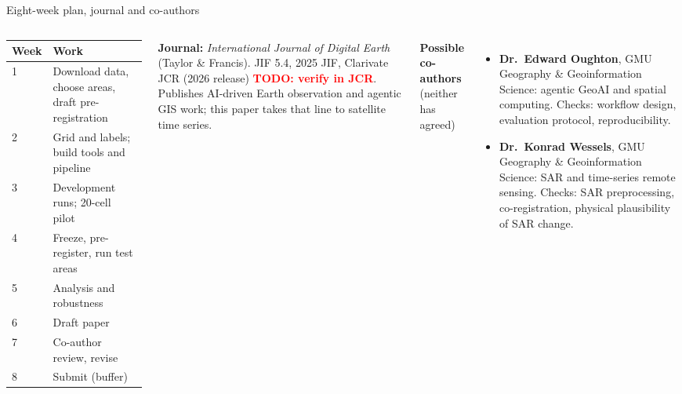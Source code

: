 \documentclass[aspectratio=169,11pt]{beamer}
\newcommand{\todo}[1]{\textcolor{red}{\textbf{TODO: #1}}}
\begin{document}
\begin{frame}[shrink=16]{Eight-week plan, journal and co-authors}
\begin{columns}[T,onlytextwidth]
\footnotesize
\begin{tabular}{@{}lp{5.6cm}@{}}
\toprule
\textbf{Week} & \textbf{Work} \\
\midrule
1 & Download data, choose areas, draft pre-registration \\
2 & Grid and labels; build tools and pipeline \\
3 & Development runs; 20-cell pilot \\
4 & Freeze, pre-register, run test areas \\
5 & Analysis and robustness \\
6 & Draft paper \\
7 & Co-author review, revise \\
8 & Submit (buffer) \\
\bottomrule
\end{tabular}
\textbf{Journal:} \emph{International Journal of Digital Earth} (Taylor \& Francis). JIF 5.4, 2025 JIF, Clarivate JCR (2026 release) \todo{verify in JCR}. Publishes AI-driven Earth observation and agentic GIS work; this paper takes that line to satellite time series.

\vspace{6pt}
\textbf{Possible co-authors} {\scriptsize(neither has agreed)}
\begin{itemize}\footnotesize
  \item \textbf{Dr.\ Edward Oughton}, GMU Geography \& Geoinformation Science: agentic GeoAI and spatial computing. Checks: workflow design, evaluation protocol, reproducibility.
  \item \textbf{Dr.\ Konrad Wessels}, GMU Geography \& Geoinformation Science: SAR and time-series remote sensing. Checks: SAR preprocessing, co-registration, physical plausibility of SAR change.
\end{itemize}
\end{columns}
\end{frame}
\end{document}
